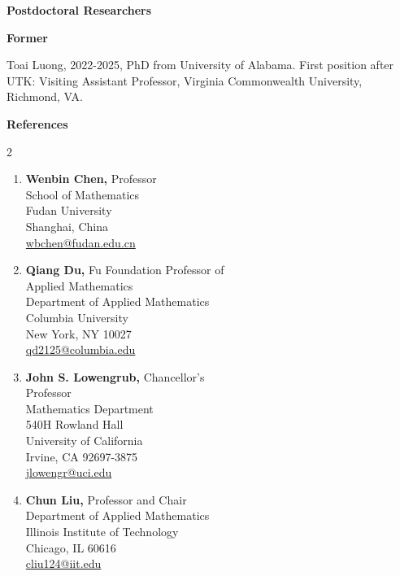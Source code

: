 \documentclass[11pt]{letter}
\begin{document}
	
	\smallskip

{\LARGE\bf  Postdoctoral Researchers}
	\begin{description}
	\item
{\Large\bf Former}
	\begin{description}
	\item
Toai Luong, 2022-2025, PhD from University of Alabama. First position after UTK: Visiting Assistant Professor, Virginia Commonwealth University, Richmond, VA.
	\end{description}

	\end{description}
	

	\clearpage
	\newpage

{\LARGE\bf  References}
	
	\begin{multicols}{2}

	
	
	\begin{enumerate}
	\item
\textbf{Wenbin Chen,} Professor
	\\
School of Mathematics
	\\
Fudan University
	\\
Shanghai, China
	\\
\url{wbchen@fudan.edu.cn}
	
	\item	
\textbf{Qiang Du,} Fu Foundation Professor of 
	\\
\hspace*{0.25in} Applied Mathematics
	\\
Department of Applied Mathematics
	\\
Columbia University
	\\
New York, NY 10027
	\\
\url{qd2125@columbia.edu}

	\item
\textbf{John S. Lowengrub,} Chancellor's 
	\\
\hspace*{0.25in} Professor
	\\
Mathematics Department
 	\\
540H Rowland Hall
	\\
University of California
	\\
Irvine, CA 92697-3875
	\\
\url{jlowengr@uci.edu}

	\item
\textbf{Chun Liu,} Professor and Chair
	\\
Department of Applied Mathematics
	\\
Illinois Institute of Technology
	\\
Chicago, IL 60616 
	\\
\url{cliu124@iit.edu}
	

\end{enumerate}
\end{multicols}
\end{document}
